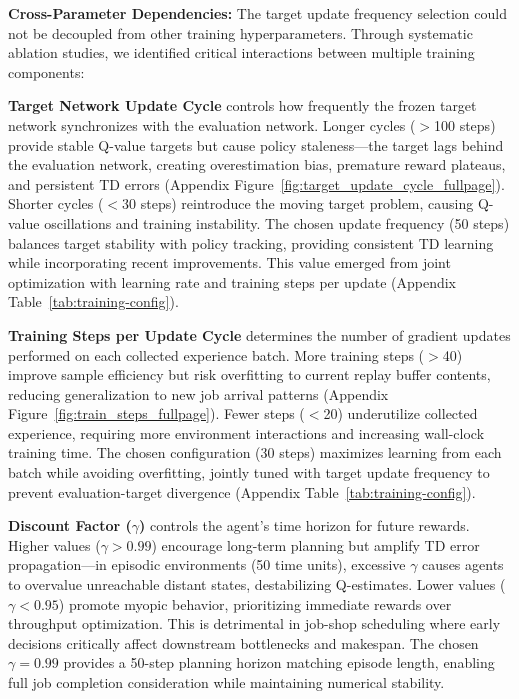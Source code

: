 \textbf{Cross-Parameter Dependencies:} The target update frequency selection could not be decoupled from other training hyperparameters. Through systematic ablation studies, we identified critical interactions between multiple training components:

\textbf{Target Network Update Cycle} controls how frequently the frozen target network synchronizes with the evaluation network. Longer cycles ($>$100 steps) provide stable Q-value targets but cause policy staleness—the target lags behind the evaluation network, creating overestimation bias, premature reward plateaus, and persistent TD errors (Appendix Figure~\ref{fig:target_update_cycle_fullpage}). Shorter cycles ($<$30 steps) reintroduce the moving target problem, causing Q-value oscillations and training instability. The chosen update frequency (50 steps) balances target stability with policy tracking, providing consistent TD learning while incorporating recent improvements. This value emerged from joint optimization with learning rate and training steps per update (Appendix Table~\ref{tab:training-config}).

\textbf{Training Steps per Update Cycle} determines the number of gradient updates performed on each collected experience batch. More training steps ($>$40) improve sample efficiency but risk overfitting to current replay buffer contents, reducing generalization to new job arrival patterns (Appendix Figure~\ref{fig:train_steps_fullpage}). Fewer steps ($<$20) underutilize collected experience, requiring more environment interactions and increasing wall-clock training time. The chosen configuration (30 steps) maximizes learning from each batch while avoiding overfitting, jointly tuned with target update frequency to prevent evaluation-target divergence (Appendix Table~\ref{tab:training-config}).

\textbf{Discount Factor ($\gamma$)} controls the agent's time horizon for future rewards. Higher values ($\gamma > 0.99$) encourage long-term planning but amplify TD error propagation—in episodic environments (50 time units), excessive $\gamma$ causes agents to overvalue unreachable distant states, destabilizing Q-estimates. Lower values ($\gamma < 0.95$) promote myopic behavior, prioritizing immediate rewards over throughput optimization. This is detrimental in job-shop scheduling where early decisions critically affect downstream bottlenecks and makespan. The chosen $\gamma = 0.99$ provides a 50-step planning horizon matching episode length, enabling full job completion consideration while maintaining numerical stability.

